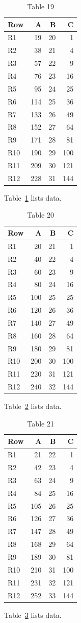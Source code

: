 \documentclass[10pt]{article}
\begin{document}
\begin{table}[ht]\centering\caption{Table 19}\label{tab:19}\begin{tabular}{lrrr}\toprule Row&A&B&C\\\midrule
R1&19&20&1\\
R2&38&21&4\\
R3&57&22&9\\
R4&76&23&16\\
R5&95&24&25\\
R6&114&25&36\\
R7&133&26&49\\
R8&152&27&64\\
R9&171&28&81\\
R10&190&29&100\\
R11&209&30&121\\
R12&228&31&144\\
\bottomrule\end{tabular}\end{table} Table~\ref{tab:19} lists data.
\begin{table}[ht]\centering\caption{Table 20}\label{tab:20}\begin{tabular}{lrrr}\toprule Row&A&B&C\\\midrule
R1&20&21&1\\
R2&40&22&4\\
R3&60&23&9\\
R4&80&24&16\\
R5&100&25&25\\
R6&120&26&36\\
R7&140&27&49\\
R8&160&28&64\\
R9&180&29&81\\
R10&200&30&100\\
R11&220&31&121\\
R12&240&32&144\\
\bottomrule\end{tabular}\end{table} Table~\ref{tab:20} lists data.
\begin{table}[ht]\centering\caption{Table 21}\label{tab:21}\begin{tabular}{lrrr}\toprule Row&A&B&C\\\midrule
R1&21&22&1\\
R2&42&23&4\\
R3&63&24&9\\
R4&84&25&16\\
R5&105&26&25\\
R6&126&27&36\\
R7&147&28&49\\
R8&168&29&64\\
R9&189&30&81\\
R10&210&31&100\\
R11&231&32&121\\
R12&252&33&144\\
\bottomrule\end{tabular}\end{table} Table~\ref{tab:21} lists data.
\end{document}
